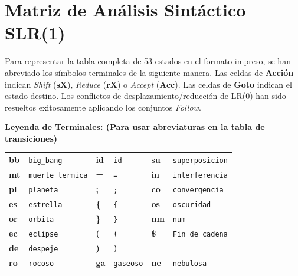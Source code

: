 \documentclass[12pt, letterpaper]{article}
\begin{document}
\section{Matriz de Análisis Sintáctico SLR(1)}

Para representar la tabla completa de 53 estados en el formato impreso, se han abreviado los símbolos terminales de la siguiente manera. Las celdas de \textbf{Acción} indican \textit{Shift} (\textbf{sX}), \textit{Reduce} (\textbf{rX}) o \textit{Accept} (\textbf{Acc}). Las celdas de \textbf{Goto} indican el estado destino. Los conflictos de desplazamiento/reducción de LR(0) han sido resueltos exitosamente aplicando los conjuntos \textit{Follow}.

\vspace{0.5cm}
\noindent\textbf{Leyenda de Terminales: (Para usar abreviaturas en la tabla de transiciones)}
\begin{center}
\small
\begin{tabular}{ll|ll|ll}
\toprule
\textbf{bb} & \texttt{big\_bang} & \textbf{id} & \texttt{id} & \textbf{su} & \texttt{superposicion} \\
\textbf{mt} & \texttt{muerte\_termica} & \textbf{=} & \texttt{=} & \textbf{in} & \texttt{interferencia} \\
\textbf{pl} & \texttt{planeta} & \textbf{;} & \texttt{;} & \textbf{co} & \texttt{convergencia} \\
\textbf{es} & \texttt{estrella} & \textbf{\{} & \texttt{\{} & \textbf{os} & \texttt{oscuridad} \\
\textbf{or} & \texttt{orbita} & \textbf{\}} & \texttt{\}} & \textbf{nm} & \texttt{num} \\
\textbf{ec} & \texttt{eclipse} & \textbf{(} & \texttt{(} & \textbf{\$} & \texttt{Fin de cadena} \\
\textbf{de} & \texttt{despeje} & \textbf{)} & \texttt{)} & & \\
\textbf{ro} & \texttt{rocoso} & \textbf{ga} & \texttt{gaseoso} & \textbf{ne} & \texttt{nebulosa} \\
\bottomrule
\end{tabular}
\end{center}

\newpage
\end{document}
